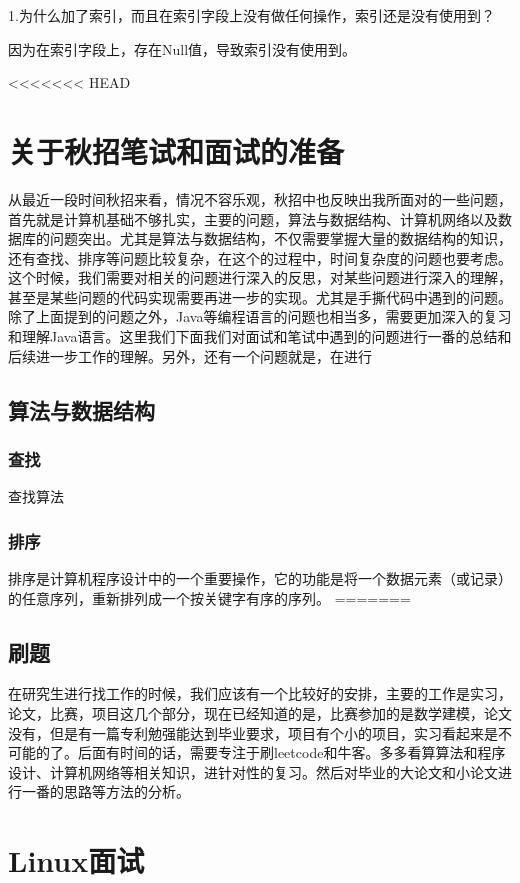 \documentclass[UTF8]{ctexart}
\begin{document}
1.为什么加了索引，而且在索引字段上没有做任何操作，索引还是没有使用到？

因为在索引字段上，存在Null值，导致索引没有使用到。

<<<<<<< HEAD
\section{关于秋招笔试和面试的准备}
从最近一段时间秋招来看，情况不容乐观，秋招中也反映出我所面对的一些问题，首先就是计算机基础不够扎实，主要的问题，算法与数据结构、计算机网络以及数据库的问题突出。尤其是算法与数据结构，不仅需要掌握大量的数据结构的知识，还有查找、排序等问题比较复杂，在这个的过程中，时间复杂度的问题也要考虑。这个时候，我们需要对相关的问题进行深入的反思，对某些问题进行深入的理解，甚至是某些问题的代码实现需要再进一步的实现。尤其是手撕代码中遇到的问题。除了上面提到的问题之外，Java等编程语言的问题也相当多，需要更加深入的复习和理解Java语言。这里我们下面我们对面试和笔试中遇到的问题进行一番的总结和后续进一步工作的理解。另外，还有一个问题就是，在进行\\
\subsection{算法与数据结构}
\subsubsection{查找}
查找算法

\subsubsection{排序}
排序是计算机程序设计中的一个重要操作，它的功能是将一个数据元素（或记录）的任意序列，重新排列成一个按关键字有序的序列。
=======
\subsection{刷题}
在研究生进行找工作的时候，我们应该有一个比较好的安排，主要的工作是实习，论文，比赛，项目这几个部分，现在已经知道的是，比赛参加的是数学建模，论文没有，但是有一篇专利勉强能达到毕业要求，项目有个小的项目，实习看起来是不可能的了。后面有时间的话，需要专注于刷leetcode和牛客。多多看算算法和程序设计、计算机网络等相关知识，进针对性的复习。然后对毕业的大论文和小论文进行一番的思路等方法的分析。


\section{Linux面试}
\end{document}
